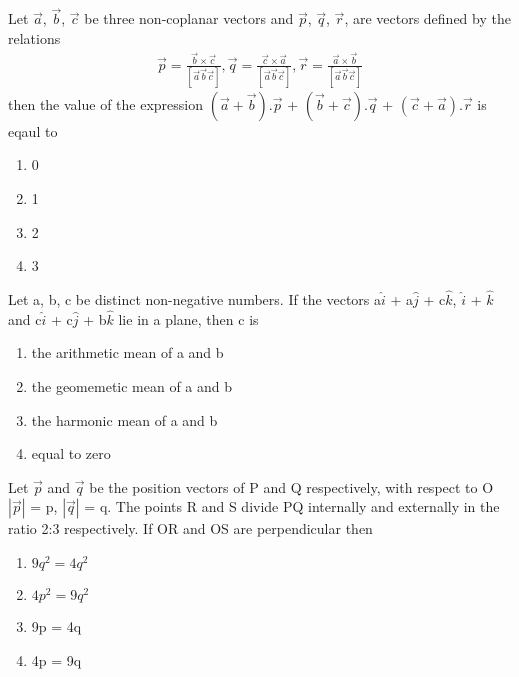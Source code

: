 \item Let $\overrightarrow{a}$, $\overrightarrow{b}$, $\overrightarrow{c}$ be three non-coplanar vectors and $\overrightarrow{p}$, $\overrightarrow{q}$, $\overrightarrow{r}$, are vectors defined by the relations 
\begin{align*}
\overrightarrow{p} = \frac{\overrightarrow{b} \times \overrightarrow{c}}{[\overrightarrow{a}\overrightarrow{b}\overrightarrow{c}]}, \overrightarrow{q} = \frac{\overrightarrow{c} \times \overrightarrow{a}}{[\overrightarrow{a}\overrightarrow{b}\overrightarrow{c}]}, \overrightarrow{r} = \frac{\overrightarrow{a} \times \overrightarrow{b}}{[\overrightarrow{a}\overrightarrow{b}\overrightarrow{c}]}
\end{align*}
then the value of the expression $(\overrightarrow{a} + \overrightarrow{b}).\overrightarrow{p}$ + $(\overrightarrow{b} + \overrightarrow{c}).\overrightarrow{q}$ + $(\overrightarrow{c} + \overrightarrow{a}).\overrightarrow{r}$ is eqaul to
\begin{enumerate}
\item 0
\item 1
\item 2
\item 3
\end{enumerate}

\item Let a, b, c be distinct non-negative numbers. If the vectors a$\hat{i}$ + a$\hat{j}$ + c$\hat{k}$, 
$\hat{i}$ + $\hat{k}$ and c$\hat{i}$ + c$\hat{j}$ + b$\hat{k}$ lie in a plane, then c is
\begin{enumerate}
\item the arithmetic mean of a and b
\item the geomemetic mean of a and b
\item the harmonic mean of a and b
\item equal to zero
\end{enumerate}

\item Let $\overrightarrow{p}$ and $\overrightarrow{q}$ be the position vectors of P and Q respectively, with respect to O $|\overrightarrow{p}|$ = p, $|\overrightarrow{q}|$ = q. The points R and S divide PQ internally and externally in the ratio 2:3 respectively. If OR and OS are perpendicular then
\begin{enumerate}
\item $9q^{2} = 4q^{2}$
\item $4p^{2} = 9q^{2}$
\item 9p = 4q
\item 4p = 9q
\end{enumerate}

